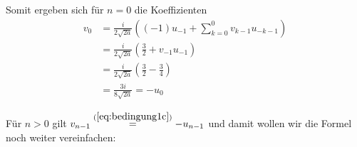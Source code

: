 Somit ergeben sich für $n=0$ die Koeffizienten
\begin{align*}
v_{0} &= \frac{i}{2\sqrt{2a}}
  ((-1)u_{-1} + \sum_{k=0}^{0} v_{k-1}u_{-k-1})
\\&= \frac{i}{2\sqrt{2a}} (\frac{3}{2} + v_{-1}u_{-1})
\\&= \frac{i}{2\sqrt{2a}} (\frac{3}{2} - \frac{3}{4})
\\&= \frac{3i}{8\sqrt{2a}} = -u_{0}
\end{align*}
\begin{comment}
Somit ergeben sich für $n=1$ die Koeffizienten
\begin{align*}
v_1 &= \frac{i}{2\sqrt{2a}}
  ((1-1)u_{1-1} + \sum_{k=0}^{1} v_{k-1}u_{1-k-1})
\\&= \frac{i}{2\sqrt{2a}} (v_{-1}u_{0} + v_{0}u_{-1})
\\&= \frac{iv_0}{2\sqrt{2a}} (-v_{-1} + u_{-1})
\\&= \frac{3i\cdoti}{2\sqrt{2a}\cdot8\sqrt{2a}} (-\frac{1}{2} - \frac{3}{2})
\\&= \frac{-3}{16\cdot2a} (-2)
\\&= \frac{3}{16a} = -u_1
& \overset{a=\frac{1}{8}}{=} 1.5
\end{align*}
und für $n=2$ ist
\begin{align*}
v_2 &=\frac{i}{2\sqrt{2a}} ((2-1)u_{2-1} + \sum_{k=0}^{2} v_{k-1}u_{2-k-1})
\\&=\frac{i}{2\sqrt{2a}} (u_{1} + v_{-1}u_{1} + v_{0}u_{0} + v_{1}u_{-1})
\\&=\frac{i}{2\sqrt{2a}} (\frac{-3}{16a}
  + \frac{1}{2}\frac{-3}{16a}
  + \frac{3i}{8\sqrt{2a}}\frac{-3i}{8\sqrt{2a}}
  + \frac{3}{16a}\frac{-3}{2})
\\&=\frac{i}{2\sqrt{2a}} (-\frac{3}{16a} - \frac{3}{32a} + \frac{9}{8^22a}
  - \frac{9}{32a})
\\&=\frac{i}{2\sqrt{2a}} (-\frac{24}{128a} - \frac{12}{128a} + \frac{9}{128a}
  - \frac{36}{128a})
\\&=\frac{i(-24-12+9-36)}{256a\sqrt{2a}}
\\&=\frac{-63i}{256a\sqrt{2a}} = -u_2 
& \overset{a=\frac{1}{8}}{\approx} -3.9375i
\end{align*}
\end{comment}
Für $n>0$ gilt $v_{n-1}\overset{(\ref{eq:bedingung1c})}{=}-u_{n-1}$ und damit
wollen wir die Formel noch weiter vereinfachen:
